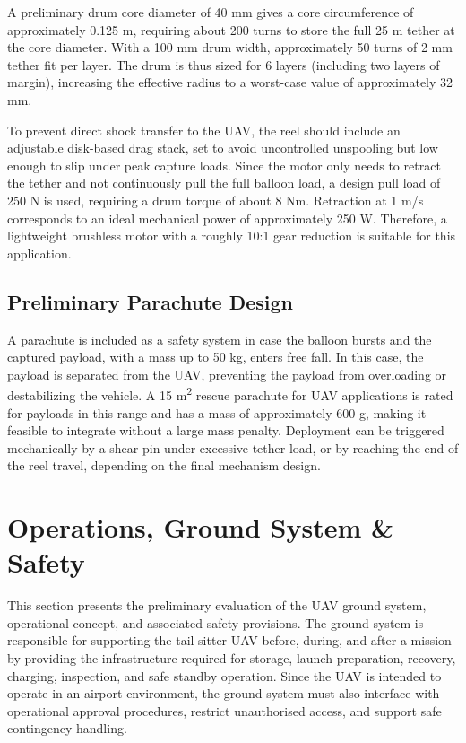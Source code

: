 A preliminary drum core diameter of 40 mm gives a core circumference of approximately 0.125 m, requiring about 200 turns to store the full 25 m tether at the core diameter. With a 100 mm drum width, approximately 50 turns of 2 mm tether fit per layer. The drum is thus sized for 6 layers (including two layers of margin), increasing the effective radius to a worst-case value of approximately 32 mm.

To prevent direct shock transfer to the UAV, the reel should include an adjustable disk-based drag stack, set to avoid uncontrolled unspooling but low enough to slip under peak capture loads. Since the motor only needs to retract the tether and not continuously pull the full balloon load, a design pull load of 250 N is used, requiring a drum torque of about 8 Nm. Retraction at 1 m/s corresponds to an ideal mechanical power of approximately 250 W. Therefore, a lightweight brushless motor with a roughly 10:1 gear reduction is suitable for this application.

\subsection{Preliminary Parachute Design}
A parachute is included as a safety system in case the balloon bursts and the captured payload, with a mass up to 50 kg, enters free fall. In this case, the payload is separated from the UAV, preventing the payload from overloading or destabilizing the vehicle.
A 15 m\textsuperscript{2} rescue parachute for UAV applications is rated for payloads in this range and has a mass of approximately 600 g, making it feasible to integrate without a large mass penalty. Deployment can be triggered mechanically by a shear pin under excessive tether load, or by reaching the end of the reel travel, depending on the final mechanism design.

\section{Operations, Ground System \& Safety}

This section presents the preliminary evaluation of the UAV ground system, operational concept, and associated safety provisions. The ground system is responsible for supporting the tail-sitter UAV before, during, and after a mission by providing the infrastructure required for storage, launch preparation, recovery, charging, inspection, and safe standby operation. Since the UAV is intended to operate in an airport environment, the ground system must also interface with operational approval procedures, restrict unauthorised access, and support safe contingency handling.

